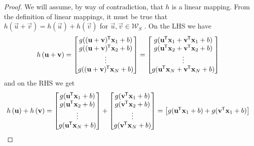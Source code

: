 \begin{proof}
    We will assume, by way of contradiction, that $h$ is a linear mapping. 
    From the definition of linear mappings, it must be true that $h(\vec{u} + \vec{v}) = h(\vec{u}) + h(\vec{v})$ for $\vec{u}, \vec{v} \in \mathcal{W}_S$ \cite{rudin2006}.
    On the LHS we have
    \begin{equation*}
        h \left( \mathbf{u} + \mathbf{v} \right)
        = \begin{bmatrix}
            g((\mathbf{u} + \mathbf{v})^{\mkern-1.5mu\mathsf{T}} \mathbf{x}_1 + b) \\
            g((\mathbf{u} + \mathbf{v})^{\mkern-1.5mu\mathsf{T}} \mathbf{x}_2 + b) \\
            \vdots \\
            g((\mathbf{u} + \mathbf{v})^{\mkern-1.5mu\mathsf{T}} \mathbf{x}_N + b) \\
        \end{bmatrix}
        = \begin{bmatrix}
            g(\mathbf{u}^{\mkern-1.5mu\mathsf{T}} \mathbf{x}_1 + \mathbf{v}^{\mkern-1.5mu\mathsf{T}} \mathbf{x}_1 + b) \\
            g(\mathbf{u}^{\mkern-1.5mu\mathsf{T}} \mathbf{x}_2 + \mathbf{v}^{\mkern-1.5mu\mathsf{T}} \mathbf{x}_2 + b) \\
            \vdots \\
            g(\mathbf{u}^{\mkern-1.5mu\mathsf{T}} \mathbf{x}_N + \mathbf{v}^{\mkern-1.5mu\mathsf{T}} \mathbf{x}_N + b) \\
        \end{bmatrix}
    \end{equation*}
    and on the RHS we get
    \begin{equation*}
        h \left( \mathbf{u} \right) + h \left( \mathbf{v} \right)
        = \begin{bmatrix}
            g(\mathbf{u}^{\mkern-1.5mu\mathsf{T}} \mathbf{x}_1 + b) \\
            g(\mathbf{u}^{\mkern-1.5mu\mathsf{T}} \mathbf{x}_2 + b) \\
            \vdots \\
            g(\mathbf{u}^{\mkern-1.5mu\mathsf{T}} \mathbf{x}_N + b) \\
        \end{bmatrix}
        + \begin{bmatrix}
            g(\mathbf{v}^{\mkern-1.5mu\mathsf{T}} \mathbf{x}_1 + b) \\
            g(\mathbf{v}^{\mkern-1.5mu\mathsf{T}} \mathbf{x}_2 + b) \\
            \vdots \\
            g(\mathbf{v}^{\mkern-1.5mu\mathsf{T}} \mathbf{x}_N + b) \\
        \end{bmatrix}
        = \begin{bmatrix}
            g(\mathbf{u}^{\mkern-1.5mu\mathsf{T}} \mathbf{x}_1 + b) + g(\mathbf{v}^{\mkern-1.5mu\mathsf{T}} \mathbf{x}_1 + b) \\

\end{bmatrix}
\end{equation*}
\end{proof}
